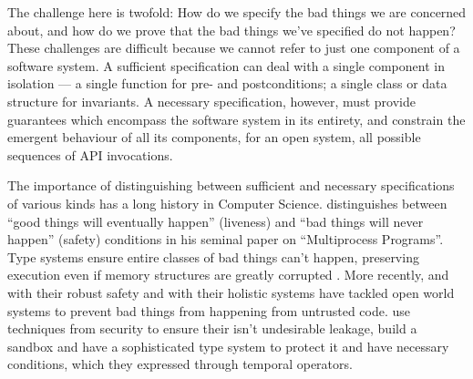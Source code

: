 
The challenge here is twofold: How do we specify the bad things we are
concerned about, and how do we prove that the bad things we've
specified do not happen?  These challenges are difficult because we
cannot refer to just one component of a software system.  A sufficient
specification can deal with a single component in isolation --- a
single function for pre- and postconditions; a single class or data
structure for invariants. A necessary specification, however, must
provide guarantees which encompass the software system in its
entirety, and constrain the emergent behaviour of all its components,
for an open system, all possible sequences of API invocations.




The importance of distinguishing between sufficient and necessary
specifications of various kinds has a long history in Computer
Science. \citeauthor{Lamport77} distinguishes between ``good things
will eventually happen'' (liveness) and ``bad things will never
happen'' (safety) conditions in his seminal paper on ``Multiprocess
Programs''.  Type systems ensure entire classes of bad things can't
happen, preserving execution even if memory structures are greatly
corrupted \cite{Rinard03}.
%
More recently, \citeauthor{ddd} and \citeauthor{sandbox} with their robust safety and
\citeauthor{FASE} with their holistic systems have tackled open world systems to prevent bad things from happening from untrusted code.
\citeauthor{ddd} use techniques from security to ensure their isn't undesirable leakage, \citeauthor{sandbox} build a sandbox and have a sophisticated type system to protect it and \citeauthor{FASE} have
necessary conditions, which they expressed through temporal
operators.


